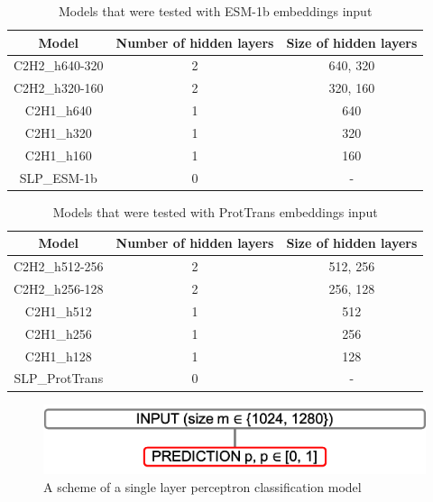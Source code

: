 \documentclass[12pt]{article}
\begin{document}
	\begin{table}[h!]
		\caption{Models that were tested with ESM-1b embeddings input}
		\vspace{0.2cm}
		\centering
		\begin{tabular}{ | c | c c | }
			\hline 
			Model & Number of hidden layers & Size of hidden layers \\
			\hline 
			C2H2\_h640-320 & 2 & 640, 320 \\
			C2H2\_h320-160 & 2 & 320, 160 \\
			C2H1\_h640 & 1 & 640 \\
			C2H1\_h320 & 1 & 320 \\
			C2H1\_h160 & 1 & 160 \\
			SLP\_ESM-1b & 0 & - \\
			\hline    
		\end{tabular}
		\label{table:modelArchitecturesESM}
	\end{table}

	\begin{table}[h!]
		\caption{Models that were tested with ProtTrans embeddings input}
		\vspace{0.2cm}
		\centering
		\begin{tabular}{ | c | c c | }
			\hline 
			Model & Number of hidden layers & Size of hidden layers \\
			\hline 
			C2H2\_h512-256 & 2 & 512, 256 \\
			C2H2\_h256-128 & 2 & 256, 128 \\
			C2H1\_h512 & 1 & 512 \\
			C2H1\_h256 & 1 & 256 \\
			C2H1\_h128 & 1 & 128 \\
			SLP\_ProtTrans & 0 & - \\
			\hline    
		\end{tabular}
		\label{table:modelArchitecturesPT}
	\end{table}

	\newpage

	\begin{figure}[h!]
		\centering
		\includegraphics[scale=0.6]{architecture_0hl.png}

		\caption{A scheme of a single layer perceptron classification model}
		\label{figure:architecture0HL}
	\end{figure}
\end{document}
